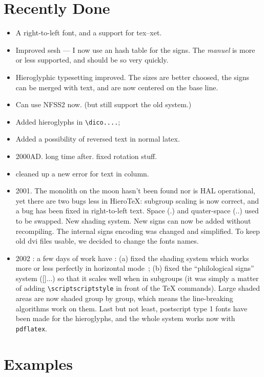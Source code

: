 \documentclass[final]{article}
\begin{document}
\section{Recently Done}
\begin{itemize}
\item A right-to-left font, and a support for tex--xet.
\item Improved sesh --- I now use an hash table for the signs. The
  {\em manuel\/} is more or less supported, and should be so very quickly.
\item Hieroglyphic typesetting improved. The sizes are better choosed,
  the signs can be merged with text, and are now centered on the base
  line.
\item Can use NFSS2 now. (but still support the old system.)
\item Added hieroglyphs in \verb/\dico..../;
\item Added a possibility of reversed text in normal latex.
\item 2000AD. long time after. fixed rotation stuff.
\item cleaned up a new error for text in column. 
\item 2001. The monolith on the moon hasn't been found nor is HAL
  operational, yet there are two bugs less in Hiero\TeX{}: subgroup
  scaling is now correct, and a bug has been fixed in right-to-left
  text. Space (.) and quater-space (..) used to be swapped. New
  shading system. New signs can now be added without recompiling. The
  internal signs encoding was changed and simplified. To keep old dvi
  files usable, we decided to change the fonts names.
\item 2002 : a few days of work have : (a) fixed the shading system
  which works more or less perfectly in horizontal mode~; (b) fixed
  the ``philological signs'' system ([]...) so that it scales well
  when in subgroups (it was simply a matter of adding
  \texttt{\textbackslash scriptscriptstyle} in front of the \TeX{}
  commands).  Large shaded areas are now shaded group by group, which
  means the line-breaking algorithms work on them. Last but not least,
  postscript type 1 fonts have been made for the hieroglyphs, and the
  whole system works now with \texttt{pdflatex}.
\end{itemize}

\appendix{}
\section{Examples}
\end{document}
